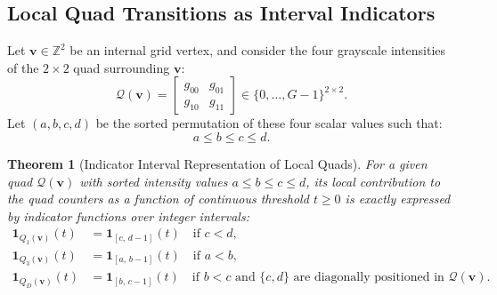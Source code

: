\documentclass[11pt,a4paper]{article}
\theoremstyle{plain}
\newtheorem{theorem}{Theorem}[section]
\theoremstyle{definition}
\theoremstyle{remark}
\newcommand{\Z}{\mathbb{Z}}
\newcommand{\indicator}{\mathbf{1}}
\begin{document}
\subsection{Local Quad Transitions as Interval Indicators}

Let $\mathbf{v} \in \Z^2$ be an internal grid vertex, and consider the four grayscale intensities of the $2 \times 2$ quad surrounding $\mathbf{v}$:
\begin{equation}
    \mathcal{Q}(\mathbf{v}) = \begin{bmatrix} g_{00} & g_{01} \\ g_{10} & g_{11} \end{bmatrix} \in \{0, \dots, G-1\}^{2 \times 2}.
\end{equation}
Let $(a, b, c, d)$ be the sorted permutation of these four scalar values such that:
\begin{equation}
    a \le b \le c \le d.
\end{equation}

\begin{theorem}[Indicator Interval Representation of Local Quads]
\label{thm:quad_intervals}
For a given quad $\mathcal{Q}(\mathbf{v})$ with sorted intensity values $a \le b \le c \le d$, its local contribution to the quad counters as a function of continuous threshold $t \ge 0$ is exactly expressed by indicator functions over integer intervals:
\begin{align}
    \indicator_{Q_1(\mathbf{v})}(t) &= \indicator_{[c, \, d-1]}(t) \quad \text{if } c < d, \label{eq:q1_interval} \\
    \indicator_{Q_3(\mathbf{v})}(t) &= \indicator_{[a, \, b-1]}(t) \quad \text{if } a < b, \label{eq:q3_interval} \\
    \indicator_{Q_D(\mathbf{v})}(t) &= \indicator_{[b, \, c-1]}(t) \quad \text{if } b < c \text{ and } \{c, d\} \text{ are diagonally positioned in } \mathcal{Q}(\mathbf{v}). \label{eq:qd_interval}
\end{align}
\end{theorem}
\end{document}
